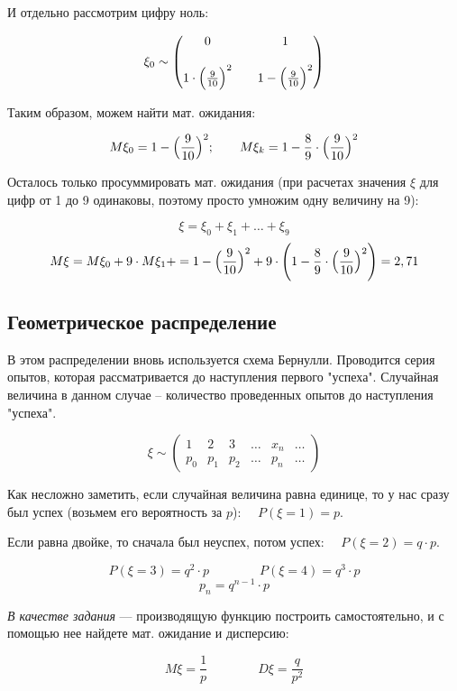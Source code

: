 \documentclass{article}
\begin{document}
\begin{itemize}
И отдельно рассмотрим цифру ноль:
	
$$\xi_0 \sim
\begin{pmatrix}
0 & & 1\\
& & \\
1 \cdot \Bigl(\frac{9}{10}\Bigr)^2 & &
1 - \Bigl(\frac{9}{10}\Bigr)^2
\end{pmatrix}$$

Таким образом, можем найти мат. ожидания:

$$M\xi_0 = 1 - \Bigl(\frac{9}{10}\Bigr)^2;
\qquad M\xi_k = 1 - \frac{8}{9} \cdot \Bigl(\frac{9}{10}\Bigr)^2$$

Осталось только просуммировать мат. ожидания (при расчетах значения $\xi$ для цифр от 1 до 9 одинаковы, поэтому просто умножим одну величину на 9):
 
$$ \xi = \xi_0 + \xi_1 + \ldots + \xi_9$$
$$ M\xi = M\xi_0 + 9 \cdot M\xi_1 + =
1 - \Bigl(\frac{9}{10}\Bigr)^2 + 9 \cdot \Biggl(1 - \frac{8}{9} \cdot \Bigl(\frac{9}{10}\Bigr)^2\Biggr) = 2,71$$
\end{itemize}

\subsection{Геометрическое распределение} 

В этом распределении вновь используется схема Бернулли. Проводится серия опытов, которая рассматривается до наступления первого "успеха". Случайная величина в данном случае -- количество проведенных опытов до наступления "успеха".

$$\xi \sim
\begin{pmatrix}
1 & 2 & 3 & \ldots & x_n & \ldots\\
p_0 & p_1 & p_2 & \ldots & p_n & \ldots
\end{pmatrix}$$

\quad

Как несложно заметить, если случайная величина равна единице, то у нас сразу был успех (возьмем его вероятность за $p$): $\quad P(\xi = 1) = p$.

Если равна двойке, то сначала был неуспех, потом успех: $\quad P(\xi = 2) = q \cdot p$.

$$P(\xi = 3) = q^2 \cdot p \qquad\qquad P(\xi = 4) = q^3 \cdot p$$
$$\boxed{p_n = q^{n - 1} \cdot p}$$

\textit{В качестве задания} --- производящую функцию построить самостоятельно, и с помощью нее найдете мат. ожидание и дисперсию:

$$\boxed{M\xi = \frac{1}{p}} \qquad\qquad \boxed{D\xi = \frac{q}{p^2}}$$
\end{document}
